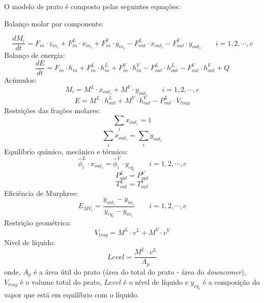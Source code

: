 O modelo de prato é composto pelas seguintes equações:
\begin{flushleft}
Balanço molar por componente:
\end{flushleft}
\begin{equation}
\dfrac{dM_i}{dt} = F_{in} \cdot z_{in_i} + F_{in}^L \cdot x_{in_i} + F_{in}^V \cdot y_{in_i} - F_{out}^L  \cdot x_{out_i} -
F_{out}^V \cdot y_{out_i}  \qquad i=1,2,\cdots,c
\end{equation}
Balanço de energia:
\begin{equation}
\dfrac{dE}{dt} = F_{in} \cdot h_{in} + F_{in}^L \cdot h_{in}^L + F_{in}^V \cdot h_{in}^V - F_{out}^L  \cdot h_{out}^L -
F_{out}^V \cdot h_{out}^V + Q
\end{equation}
Acúmulos:
\begin{equation}
M_i = M^L \cdot x_{out_i} + M^V \cdot y_{out_i}  \qquad i=1,2,\cdots,c
\end{equation}
\begin{equation}
E = M^L \cdot h_{out}^L + M^V \cdot h_{out}^V - P_{out}^L \cdot V_{tray}
\end{equation}
Restrições das frações molares:
\begin{equation}
\sum_i x_{out_i} = 1
\end{equation}
\begin{equation}
\sum_i x_{out_i} = \sum_i y_{out_i}
\end{equation}
Equilíbrio químico, mecânico e térmico:
\begin{equation}
\hat{\phi}_i^L \cdot x_{out_i} = \hat{\phi}_i^V \cdot y_{eq_i}  \qquad
i=1,2,\cdots,c
\end{equation}
\begin{equation}
P_{out}^L = P_{out}^V
\end{equation}
\begin{equation}
T_{out}^L = T_{out}^V
\end{equation}
Eficiência de Murphree:
\begin{equation}
E_{MV_i} = \dfrac{ y_{out_i} - y_{in_i} } {y_{eq_i} - y_{in_i} } \qquad i=1,2,\cdots,c
\end{equation}
Restrição geométrica:
\begin{equation}
V_{tray} = M^L \cdot v^L + M^V \cdot v^V
\end{equation}
Nível de líquido:
\begin{equation}
Level = \dfrac {M^L \cdot v^L}{A_p}
\end{equation}
onde, $A_p$ é a área útil do prato (área do total do prato - área do
\textit{downcomer}), $V_{tray}$ é o volume total do prato, $Level$ é o nível de
líquido e $y_{eq_i}$ é a composição do vapor que está em equilíbrio com o líquido.

